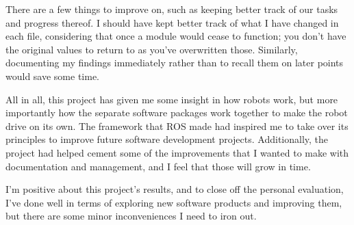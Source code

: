 There are a few things to improve on, such as keeping better track of our tasks and progress thereof. I should have kept better track of what I have changed in each file, considering that once a module would cease to function; you don't have the original values to return to as you've overwritten those. Similarly, documenting my findings immediately rather than to recall them on later points would save some time.

All in all, this project has given me some insight in how robots work, but more importantly how the separate software packages work together to make the robot drive on its own. The framework that ROS made had inspired me to take over its principles to improve future software development projects. 
Additionally, the project had helped cement some of the improvements that I wanted to make with documentation and management, and I feel that those will grow in time. 

\vspace{5mm}

I'm positive about this project's results, and to close off the personal evaluation, I've done well in terms of exploring new software products and improving them, but there are some minor inconveniences I need to iron out.
